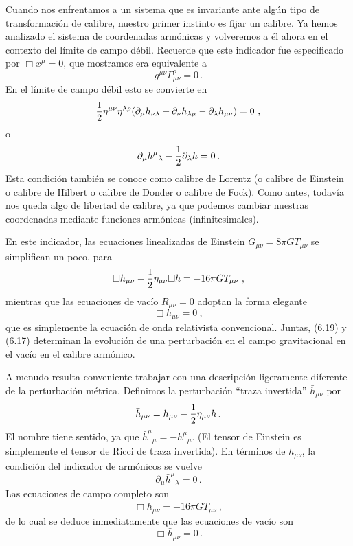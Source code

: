 \documentclass[11pt,b5paper,openany,twoside]{book}
\newcommand{\mn}{{\mu\nu}}
\newcommand{\p}[1]{{\partial_{#1}}}
\begin{document}
Cuando nos enfrentamos a un sistema que es invariante ante algún tipo de transformación de calibre, nuestro primer instinto es fijar un calibre.
Ya hemos analizado el sistema de coordenadas armónicas y volveremos a él ahora en el contexto del límite de campo débil.
Recuerde que este indicador fue especificado por $\Box x^\mu=0$, que mostramos era equivalente a
\begin{equation}
g^\mn \Gamma^\rho_\mn =0\,.\label{6.15}
\end{equation}
En el límite de campo débil esto se convierte en
\begin{equation}
{1\over 2}\eta^\mn \eta^{\lambda\rho}(\p\mu h_{\nu\lambda}
+\p\nu h_{\lambda\mu} -\p\lambda h_\mn)=0\ ,\label{6.16}
\end{equation}
o
\begin{equation}
\p\mu h^\mu{}_\lambda - {1\over 2}\p\lambda h = 0\,.\label{6.17}
\end{equation}
Esta condición también se conoce como calibre de Lorentz (o calibre de Einstein o calibre de Hilbert o calibre de Donder o calibre de Fock).
Como antes, todavía nos queda algo de libertad de calibre, ya que podemos cambiar nuestras coordenadas mediante funciones armónicas (infinitesimales).

En este indicador, las ecuaciones linealizadas de Einstein $G_\mn = 8\pi GT_\mn$ se simplifican un poco, para
\begin{equation}
\Box h_\mn - {1\over 2}\eta_\mn \Box h=-16\pi GT_\mn\ ,\label{6.18}
\end{equation}
mientras que las ecuaciones de vacío $R_\mn=0$ adoptan la forma elegante
\begin{equation}
\Box h_\mn=0\ ,\label{6.19}
\end{equation}
que es simplemente la ecuación de onda relativista convencional.
Juntas, (6.19) y (6.17) determinan la evolución de una perturbación en el campo gravitacional en el vacío en el calibre armónico.

A menudo resulta conveniente trabajar con una descripción ligeramente diferente de la perturbación métrica.
Definimos la perturbación ``traza invertida'' $\bar h_\mn$ por
\begin{equation}
\bar h_\mn= h_\mn - {1\over 2}\eta_\mn h\,.\label{6.20}
\end{equation}
El nombre tiene sentido, ya que $\bar h^\mu{}_\mu=-h^\mu{}_\mu$.
(El tensor de Einstein es simplemente el tensor de Ricci de traza invertida).
En términos de $\bar h_\mn$, la condición del indicador de armónicos se vuelve
\begin{equation}
\p\mu \bar h^\mu{}_\lambda =0\,.\label{6.21}
\end{equation}
Las ecuaciones de campo completo son
\begin{equation}
\Box \bar h_\mn = -16\pi G T_\mn\ ,\label{6.22}
\end{equation}
de lo cual se deduce inmediatamente que las ecuaciones de vacío son
\begin{equation}
\Box \bar h_\mn = 0\,.\label{6.23}
\end{equation}
\end{document}
